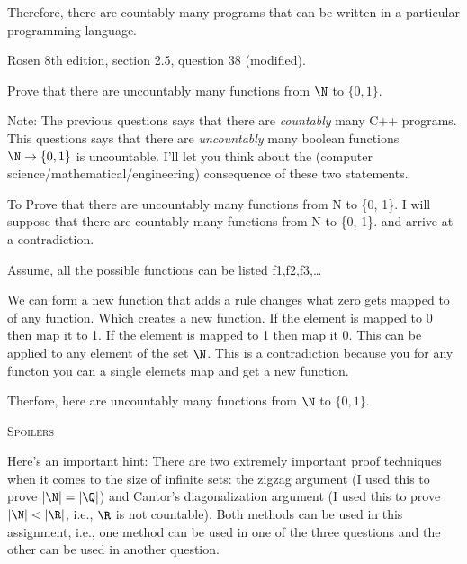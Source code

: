 Therefore, there are countably many programs that can be written in a particular
programming language.


\newpage
\nextq Rosen 8th edition, section 2.5, question 38 (modified).

Prove that there are uncountably many functions from $\N$ to $\{ 0, 1 \}$.

Note: The previous questions says that there are \textit{countably}
many C++ programs.
This questions says that there are \textit{uncountably} many boolean functions
$\N \rightarrow \{0,1\}$ is uncountable.
I'll let you think about the (computer science/mathematical/engineering) consequence of these two statements.

\SOLUTION

To Prove that there are uncountably many functions from N to \{0, 1\}. 
I will suppose that there are countably many functions from N to \{0, 1\}.
and arrive at a contradiction. 

Assume, all the possible functions can be listed f1,f2,f3,\dots

We can form a new function that adds a rule changes what zero gets mapped to of any function.
Which creates a new function. If the element is mapped to 0 then map it to 1. 
If the element is mapped to 1 then map it 0. This can be applied to any element of the set $\N$.
This is a contradiction because you for any functon you can a single 
elemets map and get a new function. 

Therfore, here are uncountably many functions from $\N$ to $\{ 0, 1 \}$.








\newpage
\textsc{Spoilers}

Here's an important hint:
There are two extremely important proof techniques when it comes to
the size of infinite sets:
the zigzag argument (I used this to prove $|\N| = |\Q|$)
and Cantor's diagonalization argument (I used this to prove $|\N| < |\R|$,
i.e., $\R$ is not countable).
Both methods can be used in this assignment, i.e.,
one method can be used in one of the three questions
and the other can be used in another question.

\newpage


